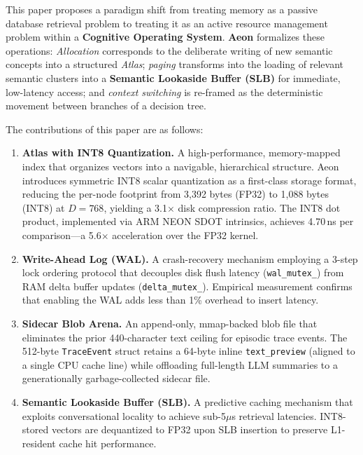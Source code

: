 \documentclass[10pt,twocolumn]{article}
\begin{document}
This paper proposes a paradigm shift from treating memory as a passive database retrieval problem to treating it as an active resource management problem within a \textbf{Cognitive Operating System}. \textbf{Aeon} formalizes these operations: \textit{Allocation} corresponds to the deliberate writing of new semantic concepts into a structured \textit{Atlas}; \textit{paging} transforms into the loading of relevant semantic clusters into a \textbf{Semantic Lookaside Buffer (SLB)} for immediate, low-latency access; and \textit{context switching} is re-framed as the deterministic movement between branches of a decision tree.

The contributions of this paper are as follows:

\begin{enumerate}
    \item \textbf{Atlas with INT8 Quantization.} A high-performance, memory-mapped index that organizes vectors into a navigable, hierarchical structure. Aeon introduces symmetric INT8 scalar quantization as a first-class storage format, reducing the per-node footprint from 3,392 bytes (FP32) to 1,088 bytes (INT8) at $D=768$, yielding a 3.1$\times$ disk compression ratio. The INT8 dot product, implemented via ARM NEON SDOT intrinsics, achieves 4.70\,ns per comparison---a 5.6$\times$ acceleration over the FP32 kernel.

    \item \textbf{Write-Ahead Log (WAL).} A crash-recovery mechanism employing a 3-step lock ordering protocol that decouples disk flush latency (\texttt{wal\_mutex\_}) from RAM delta buffer updates (\texttt{delta\_mutex\_}). Empirical measurement confirms that enabling the WAL adds less than 1\% overhead to insert latency.

    \item \textbf{Sidecar Blob Arena.} An append-only, mmap-backed blob file that eliminates the prior 440-character text ceiling for episodic trace events. The 512-byte \texttt{TraceEvent} struct retains a 64-byte inline \texttt{text\_preview} (aligned to a single CPU cache line) while offloading full-length LLM summaries to a generationally garbage-collected sidecar file.

    \item \textbf{Semantic Lookaside Buffer (SLB).} A predictive caching mechanism that exploits conversational locality to achieve sub-5$\mu$s retrieval latencies. INT8-stored vectors are dequantized to FP32 upon SLB insertion to preserve L1-resident cache hit performance.


\end{enumerate}
\end{document}
